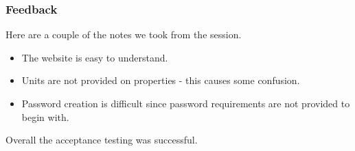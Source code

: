 \subsubsection{Feedback}
Here are a couple of the notes we took from the session.
\begin{itemize}
	\item The website is easy to understand.
	\item Units are not provided on properties - this causes some confusion.
	\item Password creation is difficult since password requirements are not provided to begin with.
\end{itemize}
Overall the acceptance testing was successful.
	